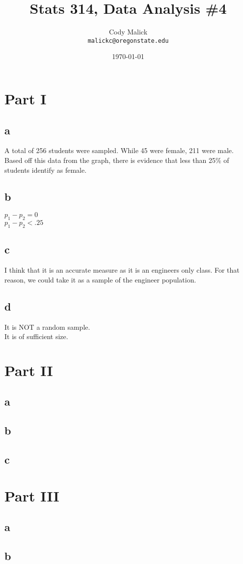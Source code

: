 \documentclass[10pt,letterpaper]{article}
\begin{document}
  \title{Stats 314, Data Analysis \#4}
  \author{Cody Malick\\
  \texttt{malickc@oregonstate.edu}}
  \date{\today}
  \maketitle

\section*{Part I}
\subsection*{a}
A total of 256 students were sampled. While 45 were female, 211 were male. 
Based off this data from the graph, there is evidence that less than 25\% of
students identify as female. 

\subsection*{b}
$p_1-p_2=0$\\
$p_1-p_2<.25$\\

\subsection*{c}
I think that it is an accurate measure as it is an engineers only class. For
that reason, we could take it as a sample of the engineer population. 

\subsection*{d}
It is NOT a random sample.\\
It is of sufficient size.\\


\section*{Part II}
\subsection*{a}
\subsection*{b}
\subsection*{c}
\section*{Part III}
\subsection*{a}
\subsection*{b}
\end{document}
